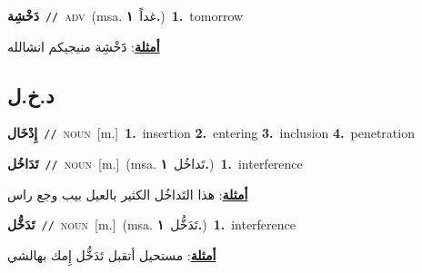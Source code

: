 \documentclass[10pt,a4paper,twoside]{article} %
\begin{document}
\begin{multicols}{2}
{\setlength\topsep{0pt}\textbf{\foreignlanguage{arabic}{دَخْشِة}}\ {\color{gray}\texttt{//}\color{black}}\ \textsc{adv}\ \color{gray}(msa. \foreignlanguage{arabic}{غداً}~\foreignlanguage{arabic}{\textbf{١.}})\color{black}\ \textbf{1.}~tomorrow\  \begin{flushright}\color{gray}\foreignlanguage{arabic}{\textbf{\underline{\foreignlanguage{arabic}{أمثلة}}}: دََخْشِة منيجيكم انشالله}\end{flushright}\color{black}} \vspace{2mm}

\vspace{-3mm}
\subsection*{\color{blue}\foreignlanguage{arabic}{د.خ.ل}\color{blue}{}} 

{\setlength\topsep{0pt}\textbf{\foreignlanguage{arabic}{إِدْخَال}}\ {\color{gray}\texttt{//}\color{black}}\ \textsc{noun}\ [m.]\ \textbf{1.}~insertion  \textbf{2.}~entering  \textbf{3.}~inclusion  \textbf{4.}~penetration\ } \vspace{2mm}

{\setlength\topsep{0pt}\textbf{\foreignlanguage{arabic}{تَدَاخُل}}\ {\color{gray}\texttt{//}\color{black}}\ \textsc{noun}\ [m.]\ \color{gray}(msa. \foreignlanguage{arabic}{تَداخُل}~\foreignlanguage{arabic}{\textbf{١.}})\color{black}\ \textbf{1.}~interference\  \begin{flushright}\color{gray}\foreignlanguage{arabic}{\textbf{\underline{\foreignlanguage{arabic}{أمثلة}}}: هذا التَداخُل الكثير بالعيل بيب وجع راس}\end{flushright}\color{black}} \vspace{2mm}

{\setlength\topsep{0pt}\textbf{\foreignlanguage{arabic}{تَدَخُّل}}\ {\color{gray}\texttt{//}\color{black}}\ \textsc{noun}\ [m.]\ \color{gray}(msa. \foreignlanguage{arabic}{تَدَخُّل}~\foreignlanguage{arabic}{\textbf{١.}})\color{black}\ \textbf{1.}~interference\  \begin{flushright}\color{gray}\foreignlanguage{arabic}{\textbf{\underline{\foreignlanguage{arabic}{أمثلة}}}: مستحيل أتقبل تَدَخُّل إِمك بهالشي}\end{flushright}\color{black}} \vspace{2mm}


\end{multicols}
\end{document}

